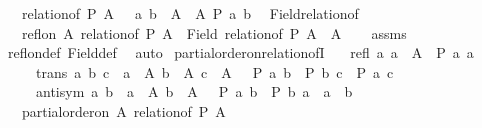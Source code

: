 \begin{isabellebody}
\ \ \ {\isachardoublequoteopen}relation{\isacharunderscore}{\kern0pt}of\ P\ A\ {\isasymequiv}\ {\isacharbraceleft}{\kern0pt}\ {\isacharparenleft}{\kern0pt}a{\isacharcomma}{\kern0pt}\ b{\isacharparenright}{\kern0pt}\ {\isasymin}\ A\ {\isasymtimes}\ A{\isachardot}{\kern0pt}\ P\ a\ b\ {\isacharbraceright}{\kern0pt}{\isachardoublequoteclose}\isanewline
\isanewline
{}\isamarkupfalse%
\ Field{\isacharunderscore}{\kern0pt}relation{\isacharunderscore}{\kern0pt}of{\isacharcolon}{\kern0pt}\isanewline
\ \ \ {\isachardoublequoteopen}refl{\isacharunderscore}{\kern0pt}on\ A\ {\isacharparenleft}{\kern0pt}relation{\isacharunderscore}{\kern0pt}of\ P\ A{\isacharparenright}{\kern0pt}{\isachardoublequoteclose}\ \ {\isachardoublequoteopen}Field\ {\isacharparenleft}{\kern0pt}relation{\isacharunderscore}{\kern0pt}of\ P\ A{\isacharparenright}{\kern0pt}\ {\isacharequal}{\kern0pt}\ A{\isachardoublequoteclose}\isanewline
%
\isadelimproof
\ \ %
\endisadelimproof
%
\isatagproof
{}\isamarkupfalse%
\ assms\ \isamarkupfalse%
\ refl{\isacharunderscore}{\kern0pt}on{\isacharunderscore}{\kern0pt}def\ Field{\isacharunderscore}{\kern0pt}def\ \isamarkupfalse%
\ auto%
\endisatagproof
{\isafoldproof}%
%
\isadelimproof
\isanewline
%
\endisadelimproof
\isanewline
{}\isamarkupfalse%
\ partial{\isacharunderscore}{\kern0pt}order{\isacharunderscore}{\kern0pt}on{\isacharunderscore}{\kern0pt}relation{\isacharunderscore}{\kern0pt}ofI{\isacharcolon}{\kern0pt}\isanewline
\ \ \ refl{\isacharcolon}{\kern0pt}\ {\isachardoublequoteopen}{\isasymAnd}a{\isachardot}{\kern0pt}\ a\ {\isasymin}\ A\ {\isasymLongrightarrow}\ P\ a\ a{\isachardoublequoteclose}\isanewline
\ \ \ \ \ trans{\isacharcolon}{\kern0pt}\ {\isachardoublequoteopen}{\isasymAnd}a\ b\ c{\isachardot}{\kern0pt}\ {\isasymlbrakk}\ a\ {\isasymin}\ A{\isacharsemicolon}{\kern0pt}\ b\ {\isasymin}\ A{\isacharsemicolon}{\kern0pt}\ c\ {\isasymin}\ A\ {\isasymrbrakk}\ {\isasymLongrightarrow}\ P\ a\ b\ {\isasymLongrightarrow}\ P\ b\ c\ {\isasymLongrightarrow}\ P\ a\ c{\isachardoublequoteclose}\isanewline
\ \ \ \ \ antisym{\isacharcolon}{\kern0pt}\ {\isachardoublequoteopen}{\isasymAnd}a\ b{\isachardot}{\kern0pt}\ {\isasymlbrakk}\ a\ {\isasymin}\ A{\isacharsemicolon}{\kern0pt}\ b\ {\isasymin}\ A\ {\isasymrbrakk}\ {\isasymLongrightarrow}\ P\ a\ b\ {\isasymLongrightarrow}\ P\ b\ a\ {\isasymLongrightarrow}\ a\ {\isacharequal}{\kern0pt}\ b{\isachardoublequoteclose}\isanewline
\ \ \ {\isachardoublequoteopen}partial{\isacharunderscore}{\kern0pt}order{\isacharunderscore}{\kern0pt}on\ A\ {\isacharparenleft}{\kern0pt}relation{\isacharunderscore}{\kern0pt}of\ P\ A{\isacharparenright}{\kern0pt}{\isachardoublequoteclose}\isanewline

\end{isabellebody}
